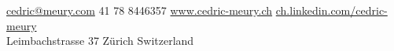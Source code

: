 \documentclass[10pt,a4paper]{article}
\begin{document}
\sloppy  %


\nobreakvspace{0.3em}  %

\noindent\href{mailto:cedric@meury.com}{cedric@meury.com}\sbull
\textsmaller{+}41 78 8446357\sbull
\href{http://www.cedric-meury.ch/}{www.cedric-meury.ch}\sbull
\href{http://ch.linkedin.com/pub/cedric-meury/29/65/b96/}{ch.linkedin.com/cedric-meury}
\\
Leimbachstrasse 37 Z\"urich\sbull
Switzerland

\spacedhrule{0.9em}{-0.4em}  %

\end{document}
